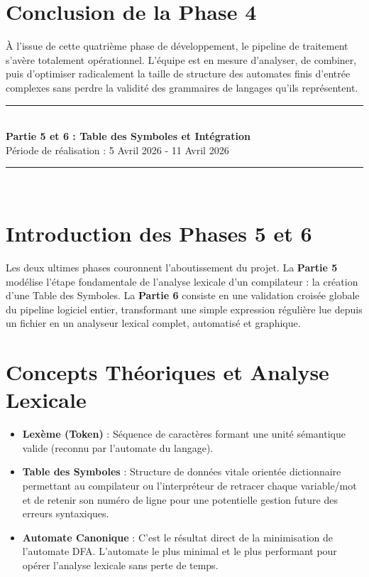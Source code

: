 \documentclass[12pt,a4paper]{article}
\newcommand{\HRule}{\rule{\linewidth}{0.5mm}}
\begin{document}
\section{Conclusion de la Phase 4}
À l'issue de cette quatrième phase de développement, le pipeline de traitement s'avère totalement opérationnel. L'équipe est en mesure d'analyser, de combiner, puis d'optimiser radicalement la taille de structure des automates finis d'entrée complexes sans perdre la validité des grammaires de langages qu'ils représentent.

\newpage
\begin{center}
\vspace*{1cm}
\HRule \\[0.5cm]
\textbf{\huge Partie 5 et 6 : Table des Symboles et Intégration} \\[0.5cm]
\Large Période de réalisation : 5 Avril 2026 - 11 Avril 2026 \\
\HRule \\
\vspace*{1cm}
\end{center}

\section{Introduction des Phases 5 et 6}
Les deux ultimes phases couronnent l'aboutissement du projet. La \textbf{Partie 5} modélise l'étape fondamentale de l'analyse lexicale d'un compilateur : la création d'une Table des Symboles. La \textbf{Partie 6} consiste en une validation croisée globale du pipeline logiciel entier, transformant une simple expression régulière lue depuis un fichier en un analyseur lexical complet, automatisé et graphique.

\section{Concepts Théoriques et Analyse Lexicale}
\begin{itemize}
    \item \textbf{Lexème (Token)} : Séquence de caractères formant une unité sémantique valide (reconnu par l'automate du langage).
    \item \textbf{Table des Symboles} : Structure de données vitale orientée dictionnaire permettant au compilateur ou l'interpréteur de retracer chaque variable/mot et de retenir son numéro de ligne pour une potentielle gestion future des erreurs syntaxiques.
    \item \textbf{Automate Canonique} : C'est le résultat direct de la minimisation de l'automate DFA. L'automate le plus minimal et le plus performant pour opérer l'analyse lexicale sans perte de temps.
\end{itemize}
\end{document}

